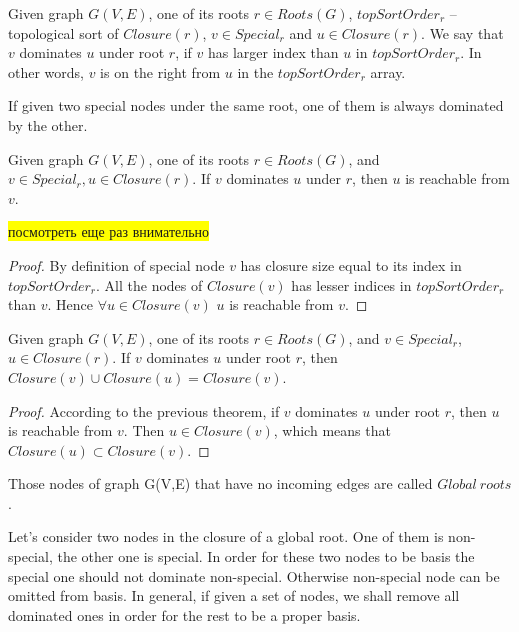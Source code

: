 \documentclass{svproc}
\newcommand{\FIXME}[1]{ %
	\colorbox{yellow}{#1}
}
\newcommand{\FIXME}[1]{ %
}
\begin{document}
\begin{definition}
    Given graph $G(V, E)$, one of its roots $r \in Roots(G)$, $topSortOrder_r$ -- topological sort of $Closure(r)$,
    $v \in Special_r$ and $u \in Closure(r)$. We say that $v$ dominates $u$ under root $r$, if $v$ has larger index than $u$ in $topSortOrder_r$. In other words, $v$ is on the right from $u$ in the $topSortOrder_r$ array.
\end{definition}

\begin{remark}
    If given two special nodes under the same root, one of them is always dominated by the other.
\end{remark}

\begin{theorem}
    Given graph $G(V,E)$, one of its roots $r \in Roots(G)$, and $v \in Special_r, u \in Closure(r)$.
    If $v$ dominates $u$ under $r$, then $u$ is reachable from $v$.
\end{theorem}

\FIXME{посмотреть еще раз внимательно}
\begin{proof}
    By definition of special node $v$ has closure size equal to its index in $topSortOrder_r$. All the nodes of $Closure(v)$ has lesser indices 
    in $topSortOrder_r$ than $v$. Hence $\forall u \in Closure(v)$ $u$ is reachable from $v$.
\end{proof}

\begin{theorem}
   Given graph $G(V,E)$, one of its roots $r \in Roots(G)$, and $v \in Special_r$, $u \in Closure(r)$. 
   If $v$ dominates $u$ under root $r$, then $Closure(v) \cup Closure(u) = Closure(v)$.
\end{theorem}
\begin{proof}
    According to the previous theorem, if $v$ dominates $u$ under root $r$, then $u$ is reachable from $v$. Then $u \in Closure(v)$,
    which means that $Closure(u) \subset Closure(v)$.
\end{proof}

\begin{definition}
	Those nodes of graph G(V,E) that have no incoming edges are called $Global\ roots$. 
\end{definition}


Let's consider two nodes in the closure of a global root. One of them is non-special, the other one is special. In order for these two nodes to be basis
the special one should not dominate non-special. Otherwise non-special node can be omitted from basis.
In general, if given a set of nodes, we shall remove all dominated ones in order for the rest to be a proper basis.
\end{document}
